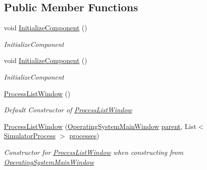 \subsection*{Public Member Functions}
\begin{DoxyCompactItemize}
\item 
void \hyperlink{class_c_p_u___o_s___simulator_1_1_process_list_window_acd39115a71c85c8bd2cf4277c8615314}{Initialize\+Component} ()
\begin{DoxyCompactList}\small\item\em Initialize\+Component \end{DoxyCompactList}\item 
void \hyperlink{class_c_p_u___o_s___simulator_1_1_process_list_window_acd39115a71c85c8bd2cf4277c8615314}{Initialize\+Component} ()
\begin{DoxyCompactList}\small\item\em Initialize\+Component \end{DoxyCompactList}\item 
\hyperlink{class_c_p_u___o_s___simulator_1_1_process_list_window_ad5798713c7171e4ca2f168136f9a8d15}{Process\+List\+Window} ()
\begin{DoxyCompactList}\small\item\em Default Constructor of \hyperlink{class_c_p_u___o_s___simulator_1_1_process_list_window}{Process\+List\+Window} \end{DoxyCompactList}\item 
\hyperlink{class_c_p_u___o_s___simulator_1_1_process_list_window_a364c9db38ef33e6fa62405718a84a427}{Process\+List\+Window} (\hyperlink{class_c_p_u___o_s___simulator_1_1_operating_system_main_window}{Operating\+System\+Main\+Window} \hyperlink{class_c_p_u___o_s___simulator_1_1_process_list_window_a51c931e0cfe4899c538507d0a999d267}{parent}, List$<$ \hyperlink{class_c_p_u___o_s___simulator_1_1_operating___system_1_1_simulator_process}{Simulator\+Process} $>$ \hyperlink{class_c_p_u___o_s___simulator_1_1_process_list_window_a9b35d1b8217b75af4b3abeea428bb61c}{processes})
\begin{DoxyCompactList}\small\item\em Constructor for \hyperlink{class_c_p_u___o_s___simulator_1_1_process_list_window}{Process\+List\+Window} when constructing from \hyperlink{class_c_p_u___o_s___simulator_1_1_operating_system_main_window}{Operating\+System\+Main\+Window} \end{DoxyCompactList}\end{DoxyCompactItemize}
